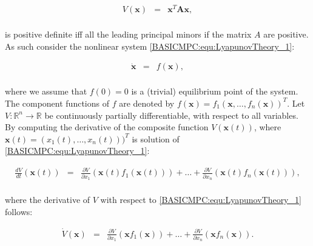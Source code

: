 	\begin{equation}
        \begin{array}{rcl}
				V(\boldsymbol{x})&=&\boldsymbol{x}^T\boldsymbol{A}\boldsymbol{x},\\
        \end{array}
        \label{BASICMPC:equ:LyapunovTheory_0}
    \end{equation}
	
	is positive definite iff all the leading principal minors if the matrix $A$ are positive. As such consider the nonlinear system \ref{BASICMPC:equ:LyapunovTheory_1}:
	
	\begin{equation}
        \begin{array}{rcl}
				\boldsymbol{\dot{x}}&=&f(\boldsymbol{x}),\\
        \end{array}
        \label{BASICMPC:equ:LyapunovTheory_1}
    \end{equation}
	
	where we assume that $f(0)=0$ is a (trivial) equilibrium point of the system. The component functions of $f$ are denoted by $f(\boldsymbol{x})=f_1(\boldsymbol{x},\dots,f_n(\boldsymbol{x}))^T$. Let $V:\mathbb{R}^n\longrightarrow\mathbb{R}$ be continuously partially differentiable, with respect to all variables. By computing the derivative of the composite function $V(\boldsymbol{x}(t))$, where $\boldsymbol{x}(t)=(x_1(t),\dots,x_n(t)))^T$ is solution of \ref{BASICMPC:equ:LyapunovTheory_1}:
	
	\begin{equation}
        \begin{array}{rcl}
				\frac{dV}{dt}(\boldsymbol{x}(t))&=&\frac{\partial V}{\partial x_1}(\boldsymbol{x}(t)f_1(\boldsymbol{x}(t)))+\dots+\frac{\partial V}{\partial x_n}(\boldsymbol{x}(t)f_n(\boldsymbol{x}(t))),\\
        \end{array}
        \label{BASICMPC:equ:LyapunovTheory_2}
    \end{equation}
		
		where the derivative of $V$ with respect to \ref{BASICMPC:equ:LyapunovTheory_1} follows:
		
		\begin{equation}
        \begin{array}{rcl}
				\dot{V}(\boldsymbol{x})&=&\frac{\partial V}{\partial x_1}(\boldsymbol{x}f_1(\boldsymbol{x}))+\dots+\frac{\partial V}{\partial x_n}(\boldsymbol{x}f_n(\boldsymbol{x})).\\
        \end{array}
        \label{BASICMPC:equ:LyapunovTheory_3}
    \end{equation}
		
